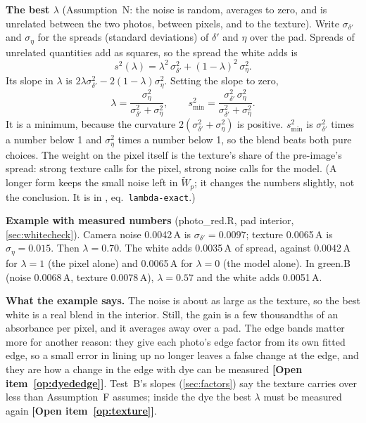\documentclass[11pt,letter]{article}
\newcommand{\file}[1]{\texttt{\seqsplit{#1}}}
\newcommand{\open}[1]{\textbf{[Open item~\ref{#1}]}}
\begin{document}
\textbf{The best $\lambda$} (Assumption~N: the noise is random, averages
to zero, and is unrelated between the two photos, between pixels, and to
the texture).  Write $\sigma_{\delta'}$ and $\sigma_\eta$ for the spreads
(standard deviations) of $\delta'$ and $\eta$ over the pad.  Spreads of
unrelated quantities add as squares, so the spread the white adds is
\begin{equation}
  s^2(\lambda) = \lambda^2\,\sigma_{\delta'}^2 + (1-\lambda)^2\,\sigma_\eta^2 .
\end{equation}
Its slope in $\lambda$ is $2\lambda\sigma_{\delta'}^2 -
2(1-\lambda)\sigma_\eta^2$.  Setting the slope to zero,
\begin{equation}
  \lambda = \frac{\sigma_\eta^2}{\sigma_{\delta'}^2 + \sigma_\eta^2},
  \qquad
  s^2_\text{min} = \frac{\sigma_{\delta'}^2\,\sigma_\eta^2}
                        {\sigma_{\delta'}^2 + \sigma_\eta^2} .
  \label{eq:lambda}
\end{equation}
It is a minimum, because the curvature
$2(\sigma_{\delta'}^2 + \sigma_\eta^2)$ is positive.  $s^2_\text{min}$ is
$\sigma_{\delta'}^2$ times a number below 1 and $\sigma_\eta^2$ times a
number below 1, so the blend beats both pure choices.  The weight on the
pixel itself is the texture's share of the pre-image's spread: strong
texture calls for the pixel, strong noise calls for the model.  (A longer
form keeps the small noise left in $\widetilde W_p$; it changes the numbers slightly,
not the conclusion.  It is in \file{tex/chain\_derivation\_B.tex},
eq.~\texttt{lambda-exact}.)

\textbf{Example with measured numbers} (photo\_red.R, pad interior,
\cref{sec:whitecheck}).  Camera noise 0.0042\,A is
$\sigma_{\delta'} = 0.0097$; texture 0.0065\,A is $\sigma_\eta = 0.015$.
Then $\lambda = 0.70$.  The white adds 0.0035\,A of spread, against
0.0042\,A for $\lambda = 1$ (the pixel alone) and 0.0065\,A for
$\lambda = 0$ (the model alone).  In green.B (noise 0.0068\,A, texture
0.0078\,A), $\lambda = 0.57$ and the white adds 0.0051\,A.

\textbf{What the example says.}  The noise is about as large as the
texture, so the best white is a real blend in the interior.  Still, the
gain is a few thousandths of an absorbance per pixel, and it averages
away over a pad.  The edge bands matter more for another
reason: they give each photo's edge factor from its own fitted edge, so a
small error in lining up no longer leaves a false change at the edge, and
they are how a change in the edge with dye can be measured
\open{op:dyededge}.  Test~B's slopes (\cref{sec:factors}) say the texture
carries over less than Assumption~F assumes; inside the dye the best $\lambda$
must be measured again \open{op:texture}.
\end{document}
